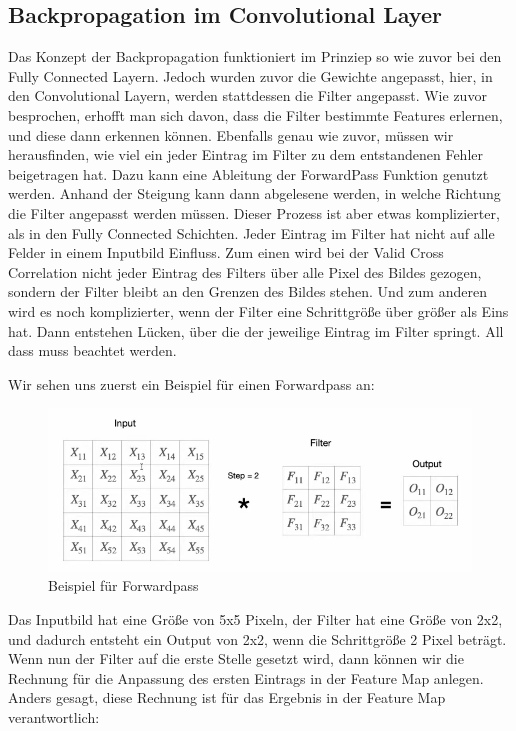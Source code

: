 \documentclass[12pt]{article}
\begin{document}
\subsection{Backpropagation im Convolutional Layer}
Das Konzept der Backpropagation funktioniert im Prinziep so wie zuvor bei den Fully Connected Layern. Jedoch wurden zuvor die Gewichte angepasst, hier, in den Convolutional Layern, werden stattdessen die Filter angepasst. Wie zuvor besprochen, erhofft man sich davon, dass die Filter bestimmte Features erlernen, und diese dann erkennen können.
Ebenfalls genau wie zuvor, müssen wir herausfinden, wie viel ein jeder Eintrag im Filter zu dem entstandenen Fehler beigetragen hat. Dazu kann eine Ableitung der ForwardPass Funktion genutzt werden. Anhand der Steigung kann dann abgelesene werden, in welche Richtung die Filter angepasst werden müssen. Dieser Prozess ist aber etwas komplizierter, als in den Fully Connected Schichten. Jeder Eintrag im Filter hat nicht auf alle Felder in einem Inputbild Einfluss. Zum einen wird bei der Valid Cross Correlation nicht jeder Eintrag des Filters über alle Pixel des Bildes gezogen, sondern der Filter bleibt an den Grenzen des Bildes stehen. Und zum anderen wird es noch komplizierter, wenn der Filter eine Schrittgröße über größer als Eins hat. Dann entstehen Lücken, über die der jeweilige Eintrag im Filter springt. All dass muss beachtet werden. 

Wir sehen uns zuerst ein Beispiel für einen Forwardpass an:

\begin{figure}[H]
\centering
\includegraphics[scale=0.50]{./Images/TemporaryPlaceholders/Bildschirmfoto vom 2024-05-20 15-33-37.png}
\caption{Beispiel für Forwardpass}
\label{Beispiel für Forwardpass}
\end{figure}

Das Inputbild hat eine Größe von 5x5 Pixeln, der Filter hat eine Größe von 2x2, und dadurch entsteht ein Output von 2x2, wenn die Schrittgröße 2 Pixel beträgt. 
Wenn nun der Filter auf die erste Stelle gesetzt wird, dann können wir die Rechnung für die Anpassung des ersten Eintrags in der Feature Map anlegen. Anders gesagt, diese Rechnung ist für das Ergebnis in der Feature Map verantwortlich:
\end{document}
